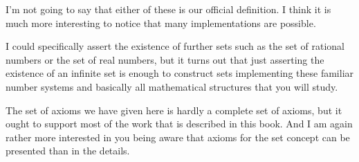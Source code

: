 \documentclass[12pt]{article}
\begin{document}
I'm not going to say that either of these is our official definition.  I think it is much more interesting to notice that many implementations are possible.

I could specifically assert the existence of further sets such as the set of rational numbers or the set of real numbers, but it turns out that just asserting the existence of an infinite set is enough to construct sets implementing these familiar number systems and basically all mathematical structures that you will study.

The set of axioms we have given here is hardly a complete set of axioms, but it ought to support most of the work that is described in this book.  And I am again rather more interested in you being aware that axioms for the set concept can be presented than in the details.
\end{document}
